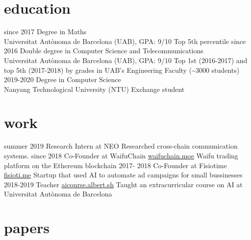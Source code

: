 \documentclass[]{friggeri-cv}
\begin{document}
\section{education}

\begin{entrylist}
  \entry
    {since 2017}
    {Degree in Maths}
    {\\Universitat Autònoma de Barcelona (UAB), GPA: 9/10}
    {Top 5th percentile}
  \entry
    {since 2016}
    {Double degree in Computer Science and Telecommunications}
    {\\Universitat Autònoma de Barcelona (UAB), GPA: 9/10}
    {Top 1st (2016-2017) and top 5th (2017-2018) by grades in UAB’s Engineering Faculty (\textasciitilde3000 students)}
  \entry
    {2019-2020}
    {Degree in Computer Science}
    {\\Nanyang Technological University (NTU)}
    {Exchange student}
\end{entrylist}

\section{work}

\begin{entrylist}
  \entry
    {summer 2019}
    {Research Intern at NEO}
    {}
    {Researched cross-chain communication systems.}
  \entry
    {since 2018}
    {Co-Founder at WaifuChain}
    {\href{https://waifuchain.moe}{waifuchain.moe}}
    {Waifu trading platform on the Ethereum blockchain}
  \entry
    {2017- 2018}
    {Co-Founder at Fisiotime}
    {\href{http://fisioti.me}{fisioti.me}}
    {Startup that used AI to automate ad campaigns for small bussinesses}
  \entry
    {2018-2019}
    {Teacher}
    {\href{https://aicourse.albert.sh}{aicourse.albert.sh}}
    {Taught an extracurricular course on AI at Universitat Autònoma de Barcelona}
\end{entrylist}

\section{papers}
\end{document}
